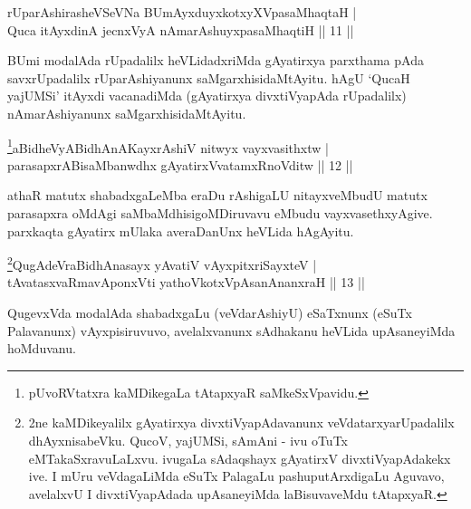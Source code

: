 
\begin{shl}
rUparAshirasheVSeVNa BUmAyxduyxkotxyXVpasaMhaqtaH | \\
Quca itAyxdinA jecnxVyA nAmarAshuyxpasaMhaqtiH \hfill ||  11 || 
\end{shl}

\begin{artha} 
BUmi modalAda rUpadalilx heVLidadxriMda gAyatirxya parxthama pAda 
savxrUpadalilx rUparAshiyanunx saMgarxhisidaMtAyitu. hAgU `QucaH 
yajUMSi' itAyxdi vacanadiMda (gAyatirxya divxtiVyapAda rUpadalilx) 
nAmarAshiyanunx saMgarxhisidaMtAyitu.
\end{artha}



\begin{shl}
\footnote{pUvoRVtatxra kaMDikegaLa tAtapxyaR saMkeSxVpavidu.}aBidheVyABidhAnAKayxrAshiV nitwyx vayxvasithxtw | \\
parasapxrABisaMbanwdhx gAyatirxVvatamxRnoVditw \hfill ||  12 ||
\end{shl}

\begin{artha} 
athaR matutx shabadxgaLeMba eraDu rAshigaLU nitayxveMbudU matutx 
parasapxra oMdAgi saMbaMdhisigoMDiruvavu eMbudu vayxvasethxyAgive. 
parxkaqta gAyatirx mUlaka averaDanUnx heVLida hAgAyitu.
\end{artha}


\begin{shl}
\footnote{2ne kaMDikeyalilx gAyatirxya divxtiVyapAdavanunx veVdatarxyarUpadalilx dhAyxnisabeVku. QucoV, yajUMSi, sAmAni - ivu oTuTx eMTakaSxravuLaLxvu. ivugaLa sAdaqshayx gAyatirxV divxtiVyapAdakekx ive. I mUru veVdagaLiMda eSuTx PalagaLu pashuputArxdigaLu Aguvavo, avelalxvU I divxtiVyapAdada upAsaneyiMda laBisuvaveMdu tAtapxyaR.}QugAdeVraBidhAnasayx yAvatiV vAyxpitxriSayxteV | \\
tAvatasxvaRmavAponxVti yathoVkotxVpAsanAnanxraH \hfill ||  13 || 
\end{shl}

\begin{artha} 
QugevxVda modalAda shabadxgaLu (veVdarAshiyU) eSaTxnunx (eSuTx 
Palavanunx) vAyxpisiruvuvo, avelalxvanunx sAdhakanu heVLida 
upAsaneyiMda hoMduvanu.
\end{artha}

